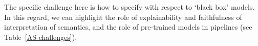 \documentclass[sigconf,nonacm]{acmart}%
\begin{document}
The specific challenge here is how to specify with respect to `black box' models. In this regard, we can highlight the role of explainability and faithfulness of interpretation of semantics, {\sc and the role of pre-trained models in pipelines} (see Table~\ref{AS-challenges}). 

\footnotesize
\end{document}
